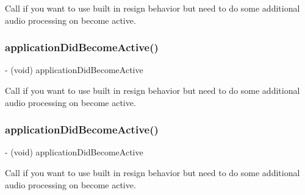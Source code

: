 Call if you want to use built in resign behavior but need to do some additional audio processing on become active. \mbox{\label{interfaceCDAudioManager_aa572c7a296c0b2de3564f8da368835ef}} 
\subsubsection{\texorpdfstring{application\+Did\+Become\+Active()}{applicationDidBecomeActive()}\hspace{0.1cm}{\footnotesize\ttfamily [3/4]}}
{\footnotesize\ttfamily -\/ (void) application\+Did\+Become\+Active \begin{DoxyParamCaption}{ }\end{DoxyParamCaption}}

Call if you want to use built in resign behavior but need to do some additional audio processing on become active. \mbox{\label{interfaceCDAudioManager_aa572c7a296c0b2de3564f8da368835ef}} 
\subsubsection{\texorpdfstring{application\+Did\+Become\+Active()}{applicationDidBecomeActive()}\hspace{0.1cm}{\footnotesize\ttfamily [4/4]}}
{\footnotesize\ttfamily -\/ (void) application\+Did\+Become\+Active \begin{DoxyParamCaption}{ }\end{DoxyParamCaption}}

Call if you want to use built in resign behavior but need to do some additional audio processing on become active. \mbox{\label{interfaceCDAudioManager_a5265cc9a823688a547aa60e8995ba423}} 
